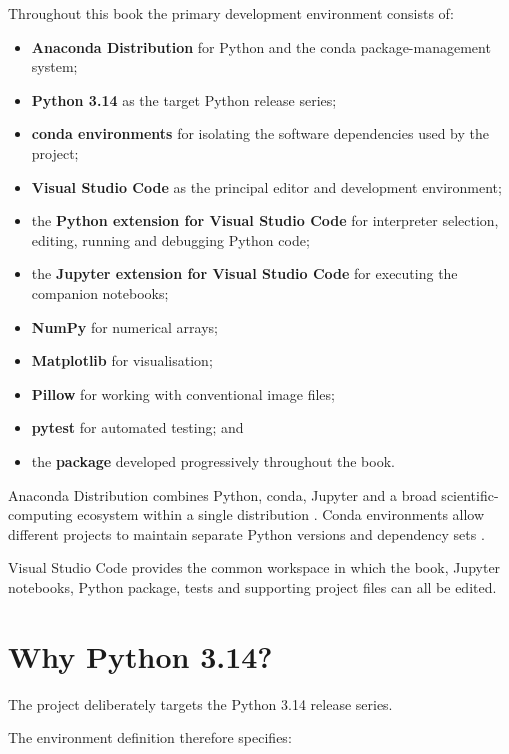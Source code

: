 Throughout this book the primary development environment consists of:

\begin{itemize}
    \item \textbf{Anaconda Distribution} for Python and the conda
    package-management system;
    \item \textbf{Python 3.14} as the target Python release series;
    \item \textbf{conda environments} for isolating the software
    dependencies used by the project;
    \item \textbf{Visual Studio Code} as the principal editor and
    development environment;
    \item the \textbf{Python extension for Visual Studio Code} for
    interpreter selection, editing, running and debugging Python code;
    \item the \textbf{Jupyter extension for Visual Studio Code} for
    executing the companion notebooks;
    \item \textbf{NumPy} for numerical arrays;
    \item \textbf{Matplotlib} for visualisation;
    \item \textbf{Pillow} for working with conventional image files;
    \item \textbf{pytest} for automated testing; and
    \item the \textbf{\pyimage{} package} developed progressively
    throughout the book.
\end{itemize}

Anaconda Distribution combines Python, conda, Jupyter and a broad
scientific-computing ecosystem within a single distribution
\cite{anaconda_distribution}. Conda environments allow different
projects to maintain separate Python versions and dependency sets
\cite{conda_environments}.

Visual Studio Code provides the common workspace in which the book,
Jupyter notebooks, Python package, tests and supporting project files
can all be edited.


\section{Why Python 3.14?}
\label{sec:python-314}

The project deliberately targets the Python 3.14 release series.

The environment definition therefore specifies:

